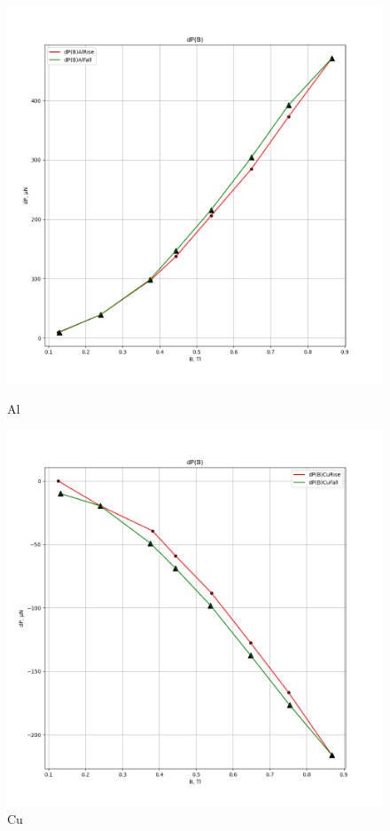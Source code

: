 \documentclass[a4paper, 12pt]{article}
\begin{document}
\begin{figure}[H]
    \centering
    \begin{minipage}{0.5\textwidth}
        \centering
        \includegraphics[width=\textwidth]{img/dP(B)Al.png}
        \caption{Al}
        \label{fig:image1}
    \end{minipage}\hfill
    \begin{minipage}{0.5\textwidth}
        \centering
        \includegraphics[width=\textwidth]{img/dP(B)Cu.png}
        \caption{Cu}
        \label{fig:image2}
    \end{minipage}
\end{figure}
\end{document}

